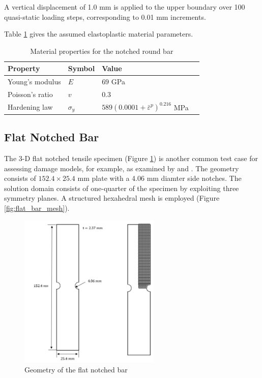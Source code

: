 \documentclass[sn-mathphys,Numbered,draft]{sn-jnl}%
\begin{document}
A vertical displacement of 1.0 \si{\milli\meter} is applied to the upper boundary over 100 quasi-static loading steps, corresponding to 0.01 \si{\milli\meter} increments.

Table \ref{tab:notched_bar_mat} gives the assumed elastoplastic material parameters.
\begin{table}[htb]
	\centering
		\begin{tabular}{llll} \hline
			Property & Symbol & Value  \\ \hline 
			Young's modulus & $E$ & $69$ GPa \\
			Poisson's ratio & $v$ & $0.3$   \\
			Hardening law & $\sigma_y$ & $589({0.0001+\bar{\varepsilon}}^p)^{0.216}$ MPa  \\
			\hline
		\end{tabular}
	\caption{Material properties for the notched round bar}
	\label{tab:notched_bar_mat}
\end{table}



\subsection{Flat Notched Bar}
The 3-D flat notched tensile specimen (Figure \ref{fig:flat_bar_geom}) is another common test case for assessing damage models, for example, as examined by \citet{borden_phase-field_2016} and \citet{eldahshan_phase_2021}.
The geometry consists of $152.4 \times 25.4$ \si{\milli\meter} plate with a 4.06 \si{\milli\meter} diamter side notches.
The solution domain consists of one-quarter of the specimen by exploiting three symmetry planes.
A structured hexahedral mesh is employed (Figure \ref{fig:flat_bar_mesh}).

\begin{figure}[htb] \label{fig:flat_bar_geom}
\begin{center}
	\includegraphics[width=0.6\textwidth]{./Figures/finiteVolumeImplementation/inhomogenousDeformation/flatNotchedTensile.png}
\caption{Geometry of the flat notched bar}
\end{center}
\end{figure}
\end{document}
